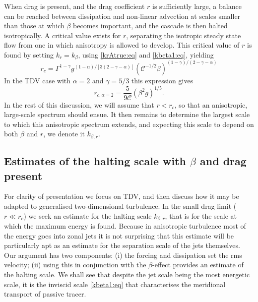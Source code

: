 \documentclass{jfm}
\newcommand{\ca}  [1]{\mathcal{#1}}
\begin{document}
When drag is present, and the drag coefficient $r$ is sufficiently
large, a balance can be reached between dissipation and non-linear
advection at scales smaller than those at which $\beta$ becomes
important, and the cascade is then halted isotropically.  A critical
value exists for $r$, separating the isotropic steady state flow from
one in which anisotropy is allowed to develop.  This critical value of
$r$ is found by setting $k_r = k_{\beta}$, using \eqref{krAtrue:eq}
and \eqref{kbeta1:eq}, yielding
\begin{equation}
r_c = \Gamma^{1-\gamma}g^{(1-\alpha)/[3(2-\gamma-\alpha)]}
(\ca{C}^{-1/2}\beta)^{(1-\gamma)/(2-\gamma-\alpha)}
\label{rcrit:eq}
\end{equation}
In the TDV case with $\alpha=2$ and $\gamma=5/3$ this expression gives
\begin{equation}
r_{c,\alpha=2} = \frac{5}{9\ca{C}}(\beta^2g)^{1/5}.
\label{rcrit2d:eq}
\end{equation}
In the rest of this discussion, we will assume that $r<r_c$, so that
an anisotropic, large-scale spectrum should ensue.  It then remains to
determine the largest scale to which this anisotropic spectrum
extends, and expecting this scale to depend on both $\beta$ and $r$,
we denote it $k_{\beta,r}$.

\subsection{Estimates of the halting scale with $\beta$ and drag present}

For clarity of presentation we focus on TDV, and then discuss how it
may be adapted to generalised two-dimensional turbulence.  In the
small drag limit ($r \ll r_c$) we seek an estimate for the halting
scale $k_{\beta,r}$, that is for the scale at which the maximum energy
is found.  Because in anisotropic turbulence most of the energy goes
into zonal jets it is not surprising that this estimate will be
particularly apt as an estimate for the separation scale of the jets
themselves.  Our argument has two components: (i) the forcing and
dissipation set the rms velocity; (ii) using this in conjunction with
the $\beta$-effect provides an estimate of the halting scale.  We
shall see that despite the jet scale being the most energetic scale,
it is the inviscid scale \eqref{kbeta1:eq} that characterises the
meridional transport of passive tracer.
\end{document}
